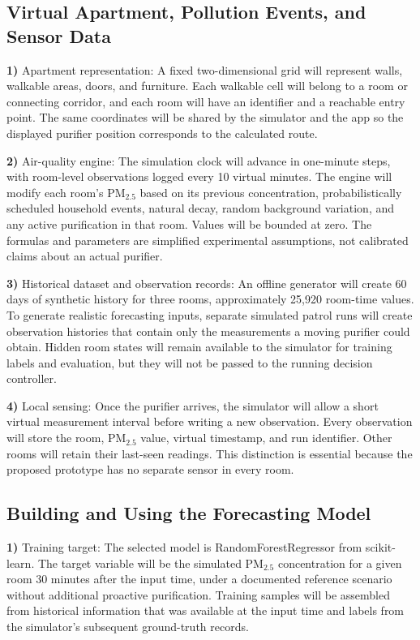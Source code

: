 \documentclass[conference]{IEEEtran}
\begin{document}
\subsection{Virtual Apartment, Pollution Events, and Sensor Data}
\par\noindent\textbf{1)} Apartment representation:
A fixed two-dimensional grid will represent walls, walkable areas, doors, and furniture. Each walkable cell will belong to a room or connecting corridor, and each room will have an identifier and a reachable entry point. The same coordinates will be shared by the simulator and the app so the displayed purifier position corresponds to the calculated route.

\par\noindent\textbf{2)} Air-quality engine:
The simulation clock will advance in one-minute steps, with room-level observations logged every 10 virtual minutes. The engine will modify each room's PM$_{2.5}$ based on its previous concentration, probabilistically scheduled household events, natural decay, random background variation, and any active purification in that room. Values will be bounded at zero. The formulas and parameters are simplified experimental assumptions, not calibrated claims about an actual purifier.

\par\noindent\textbf{3)} Historical dataset and observation records:
An offline generator will create 60 days of synthetic history for three rooms, approximately 25,920 room-time values. To generate realistic forecasting inputs, separate simulated patrol runs will create observation histories that contain only the measurements a moving purifier could obtain. Hidden room states will remain available to the simulator for training labels and evaluation, but they will not be passed to the running decision controller.

\par\noindent\textbf{4)} Local sensing:
Once the purifier arrives, the simulator will allow a short virtual measurement interval before writing a new observation. Every observation will store the room, PM$_{2.5}$ value, virtual timestamp, and run identifier. Other rooms will retain their last-seen readings. This distinction is essential because the proposed prototype has no separate sensor in every room.

\subsection{Building and Using the Forecasting Model}
\par\noindent\textbf{1)} Training target:
The selected model is RandomForestRegressor from scikit-learn. The target variable will be the simulated PM$_{2.5}$ concentration for a given room 30 minutes after the input time, under a documented reference scenario without additional proactive purification. Training samples will be assembled from historical information that was available at the input time and labels from the simulator's subsequent ground-truth records.
\end{document}
